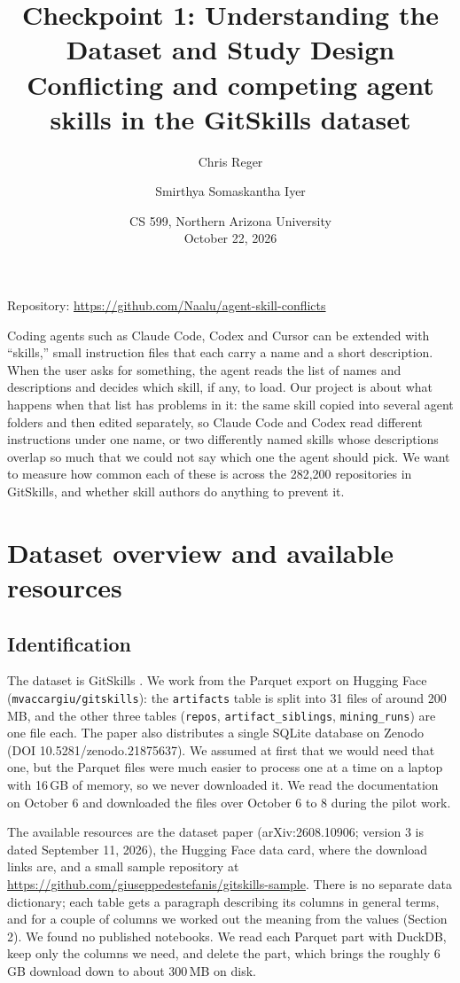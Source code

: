 \documentclass[11pt]{article}
\title{\large\bfseries Checkpoint 1: Understanding the Dataset and Study Design\\[4pt]
\normalsize\mdseries Conflicting and competing agent skills in the GitSkills dataset}
\author{\normalsize Chris Reger \and \normalsize Smirthya Somaskantha Iyer}
\date{\normalsize CS 599, Northern Arizona University \\ October 22, 2026}
\begin{document}
\maketitle

\noindent Repository: \url{https://github.com/Naalu/agent-skill-conflicts}
\medskip

\noindent Coding agents such as Claude Code, Codex and Cursor can be extended with ``skills,'' small instruction files that
each carry a name and a short description. When the user asks for something, the agent reads the list of names and
descriptions and decides which skill, if any, to load. Our project is about what happens when that list has problems in it:
the same skill copied into several agent folders and then edited separately, so Claude Code and Codex read different
instructions under one name, or two differently named skills whose descriptions overlap so much that we could not say which
one the agent should pick. We want to measure how common each of these is across the 282{,}200 repositories in GitSkills,
and whether skill authors do anything to prevent it.

\section{Dataset overview and available resources}

\subsection{Identification}
The dataset is GitSkills \cite{destefanis2026gitskills}. We work from the Parquet export on Hugging Face
(\texttt{mvaccargiu/gitskills}): the \texttt{artifacts} table is split into 31 files of around 200\,MB, and the other three
tables (\texttt{repos}, \texttt{artifact\_siblings}, \texttt{mining\_runs}) are one file each. The paper also distributes a
single SQLite database on Zenodo (DOI 10.5281/\allowbreak zenodo.21875637). We assumed at first that we would need that one,
but the Parquet files were much easier to process one at a time on a laptop with 16\,GB of memory, so we never downloaded
it. We read the documentation on October 6 and downloaded the files over October 6 to 8 during the pilot work.

The available resources are the dataset paper (arXiv:2608.10906; version 3 is dated September 11, 2026), the Hugging Face
data card, where the download links are, and a small sample repository at
\url{https://github.com/giuseppedestefanis/gitskills-sample}. There is no separate data dictionary; each table gets a paragraph
describing its columns in general terms, and for a couple of columns we worked out the meaning from the values (Section 2).
We found no published notebooks. We read each Parquet part with DuckDB, keep only the columns we need, and delete the part,
which brings the roughly 6\,GB download down to about 300\,MB on disk.
\end{document}
